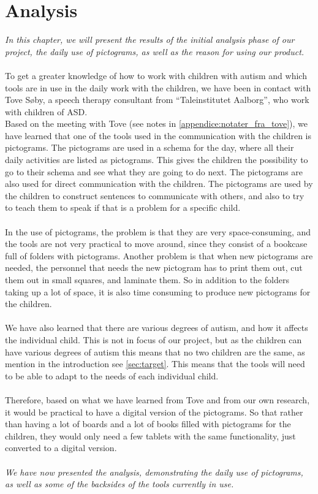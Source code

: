 \chapter{Analysis}

\textit{In this chapter, we will present the results of the initial analysis phase of our project, the daily use of pictograms, as well as the reason for using our product.}\\
\\
To get a greater knowledge of how to work with children with autism and which tools are in use in the daily work with the children, we have been in contact with  Tove S\o{}by, a speech therapy consultant from ``Taleinstitutet Aalborg'', who work with children of ASD.\\ 

Based on the meeting with Tove (see notes in \autoref{appendice:notater_fra_tove}), we have learned that one of the tools used in the communication with the children is pictograms.
The pictograms are used in a schema for the day, where all their daily activities are listed as pictograms.
This gives the children the possibility to go to their schema and see what they are going to do next. 
The pictograms are also used for direct communication with the children. The pictograms are used by the children to construct sentences to communicate with others, and also to try to teach them to speak if that is a problem for a specific child.\\
\\
In the use of pictograms, the problem is that they are very space-consuming, and the tools are not very practical to move around, since they consist of a bookcase full of folders with pictograms. 
Another problem is that when new pictograms are needed, the personnel that needs the new pictogram has to print them out, cut them out in small squares, and laminate them. 
So in addition to the folders taking up a lot of space, it is also time consuming to produce new pictograms for the children.\\ 
\\
We have also learned that there are various degrees of autism, and how it affects the individual child. 
This is not in focus of our project, but as the children can have various degrees of autism this means that no two children are the same, as mention in the introduction see \autoref{sec:target}. 
This means that the tools will need to be able to adapt to the needs of each individual child.\\
\\ 
Therefore, based on what we have learned from Tove and from our own research, it would be practical to have a digital version of the pictograms. So that rather than having a lot of boards and a lot of books filled with pictograms for the children, they would only need a few tablets with the same functionality, just converted to a digital version.\\
\\
\textit{We have now presented the analysis, demonstrating the daily use of pictograms, as well as some of the backsides of the tools currently in use. }